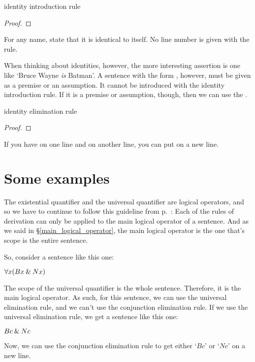 \begin{factboxy}{identity introduction rule}
\begin{proof}
	 \ii{}
\end{proof}

\small{For any name, state that it is identical to itself. No line number is given with the rule.}
\end{factboxy}

When thinking about identities, however, the more interesting assertion is one like `Bruce Wayne \textit{is} Batman'. A sentence with the form , however, must be given as a premise or an assumption. It cannot be introduced with the identity introduction rule. If it is a premise or assumption, though, then we can use the .  

\begin{factboxy}{identity elimination rule}
\begin{proof}
	 
\end{proof}

\small{If you have  on one line and  on another line, you can put  on a new line.}
\end{factboxy}




\section{Some examples}

The existential quantifier and the universal quantifier are logical operators, and so we have to continue to follow this guideline from p.~\pageref{rule-proofs-main-operator}: {Each of the rules of derivation can only be applied to the main logical operator of a sentence}. And as we said in \S \ref{main_logical_operator}, the main logical operator is the one that's scope is the entire sentence. 

So, consider a sentence like this one:

\begin{ebullet}
\item[] $\forall x(Bx \mathbin{\&} Nx)$
\end{ebullet}
The scope of the universal quantifier is the whole sentence. Therefore, it is the main logical operator. As such, for this sentence, we can use the universal elimination rule, and we can't use the conjunction elimination rule. If we use the universal elimination rule, we get a sentence like this one:
\begin{ebullet}
\item[] $Bc \mathbin{\&} Nc$
\end{ebullet}
Now, we can use the conjunction elimination rule to get either `$Bc$' or `$Nc$' on a new line. %

